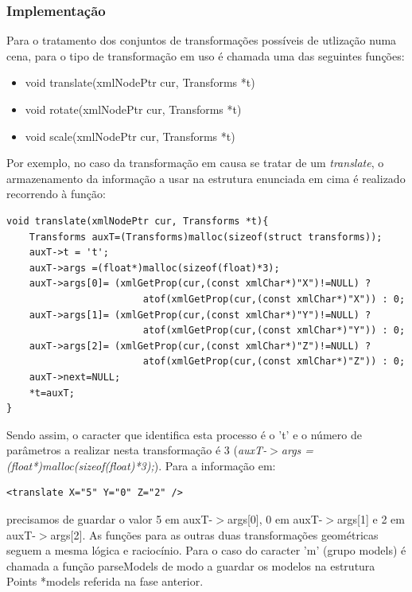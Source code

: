 \documentclass{article}
\begin{document}
\subsubsection{Implementação}
Para o tratamento dos conjuntos de transformações possíveis de utlização numa cena, para o tipo de transformação em uso é chamada uma das seguintes funções:
\begin{itemize}
    \item void translate(xmlNodePtr cur, Transforms *t)
    \item void rotate(xmlNodePtr cur, Transforms *t)
    \item void scale(xmlNodePtr cur, Transforms *t)
\end{itemize}
Por exemplo, no caso da transformação em causa se tratar de um \textit{translate}, o armazenamento da informação a usar na estrutura enunciada em cima é realizado recorrendo à função:
\begin{verbatim}
void translate(xmlNodePtr cur, Transforms *t){
    Transforms auxT=(Transforms)malloc(sizeof(struct transforms));
    auxT->t = 't';
    auxT->args =(float*)malloc(sizeof(float)*3);
    auxT->args[0]= (xmlGetProp(cur,(const xmlChar*)"X")!=NULL) ? 
                        atof(xmlGetProp(cur,(const xmlChar*)"X")) : 0;
    auxT->args[1]= (xmlGetProp(cur,(const xmlChar*)"Y")!=NULL) ? 
                        atof(xmlGetProp(cur,(const xmlChar*)"Y")) : 0;
    auxT->args[2]= (xmlGetProp(cur,(const xmlChar*)"Z")!=NULL) ? 
                        atof(xmlGetProp(cur,(const xmlChar*)"Z")) : 0;
    auxT->next=NULL;
    *t=auxT;
}
\end{verbatim}
Sendo assim, o caracter que identifica esta processo é o 't' e o número de parâmetros a realizar nesta transformação é 3 (\textit{auxT-$>$args =(float*)malloc(sizeof(float)*3);}).
\newline
Para a informação em:
\begin{verbatim}
<translate X="5" Y="0" Z="2" />
\end{verbatim}
precisamos de guardar o valor 5 em auxT-$>$args[0], 0 em auxT-$>$args[1] e 2 em auxT-$>$args[2].
\newline
As funções para as outras duas transformações geométricas seguem a mesma lógica e raciocínio.
Para o caso do caracter 'm' (grupo models) é chamada a função parseModels de modo a guardar os modelos na estrutura Points *models referida na fase anterior.
\end{document}

